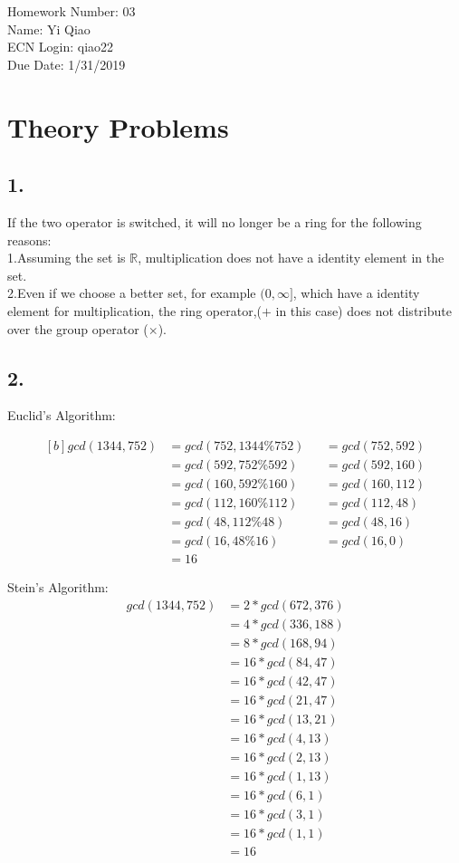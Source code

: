 \documentclass[11pt]{article}
\begin{document}
\noindent Homework Number: 03\\
Name: Yi Qiao\\
ECN Login: qiao22\\
Due Date: 1/31/2019\\
\section*{Theory Problems}
\subsection*{1.} 
If the two operator is switched, it will no longer be a ring for the following reasons:\\
\indent1.Assuming the set is $\mathbb{R}$, multiplication does not have a identity element in the set.\\
\indent2.Even if we choose a better set, for example $(0,\infty]$, which have a identity element for multiplication, the ring operator,($+$ in this case) does not distribute over the group operator ($\times$).

\subsection*{2.}
\begin{multicols}{2}
	Euclid's Algorithm:

	\begin{equation}	
	\begin{aligned}[b]
	gcd(1344,752)&=gcd(752,1344\%752)&	&=gcd(752,592)\\
	&=gcd(592,752\%592)	&	&=gcd(592,160)\\
	&=gcd(160,592\%160)	&	&=gcd(160,112)\\
	&=gcd(112,160\%112)	&	&=gcd(112,48)\\
	&=gcd(48,112\%48)	&	&=gcd(48,16)\\
	&=gcd(16,48\%16)	&	&=gcd(16,0)\\
	&=16
	\end{aligned}
	\end{equation}
	
	Stein's Algorithm:
	\begin{equation}
	\begin{split}
	gcd(1344,752)&=2*gcd(672,376)\\
	&=4*gcd(336,188)\\
	&=8*gcd(168,94)\\
	&=16*gcd(84,47)\\
	&=16*gcd(42,47)\\
	&=16*gcd(21,47)\\
	&=16*gcd(13,21)\\
	&=16*gcd(4,13)\\
	&=16*gcd(2,13)\\
	&=16*gcd(1,13)\\
	&=16*gcd(6,1)\\
	&=16*gcd(3,1)\\
	&=16*gcd(1,1)\\
	&=16
	\end{split}
	\end{equation}
\end{multicols}
\pagebreak
\end{document}

